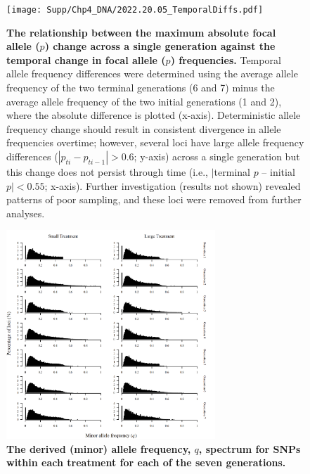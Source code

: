 \begin{figure}[!htb]
    \centering
    \texttt{[image: Supp/Chp4\_DNA/2022.20.05\_TemporalDiffs.pdf]}
\caption[The relationship between the maximum absolute focal allele ($p$) change across a single generation against the temporal change in focal allele ($p$) frequencies.]{\textbf{The relationship between the maximum absolute focal allele ($p$) change across a single generation against the temporal change in focal allele ($p$) frequencies.} Temporal allele frequency differences were determined using the average allele frequency of the two terminal generations (6 and 7) minus the average allele frequency of the two initial generations (1 and 2), where the absolute difference is plotted (x-axis). Deterministic allele frequency change should result in consistent divergence in allele frequencies overtime; however, several loci have large allele frequency differences ($|p_{ti} - p_{ti-1}| > 0.6$; y-axis) across a single generation but this change does not persist through time (i.e., $|$terminal $p$ – initial $p| < 0.55$; x-axis). Further investigation (results not shown) revealed patterns of poor sampling, and these loci were removed from further analyses. }
    \label{fig:DNAsuppBouncyP}
\end{figure}
\vspace{-2cm}
\FloatBarrier
\begin{figure}[!ht]
    \centering
    \includegraphics[width=0.7\textwidth]{Supp/Chp4_DNA/MAF_trtxgen_22.png}
\caption[The derived (minor) allele frequency, q, spectrum for SNPs within each treatment for each of the seven generations. ]{\textbf{The derived (minor) allele frequency, $q$, spectrum for SNPs within each treatment for each of the seven generations. } }
    \label{fig:DNAsuppSiteFreqMAF}
\end{figure}

